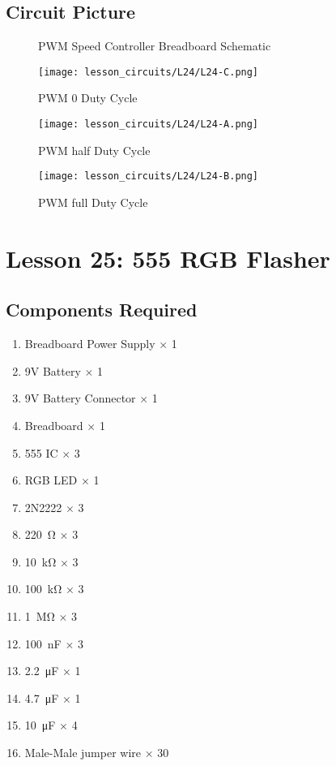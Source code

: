 \subsection{Circuit Picture}
\begin{figure}[!h]
    \centering
    \caption{PWM Speed Controller Breadboard Schematic}
    \label{fig:555_pwm_sch}
\end{figure}
\begin{figure}[!h]
    \centering
    \texttt{[image: lesson\_circuits/L24/L24-C.png]}
    \caption{PWM 0 Duty Cycle}
    \label{fig:555_pwm_obb}
\end{figure}
\begin{figure}[!h]
    \centering
    \texttt{[image: lesson\_circuits/L24/L24-A.png]}
    \caption{PWM half Duty Cycle}
    \label{fig:555_pwm_obb1}
\end{figure}
\begin{figure}[!h]
    \centering
    \texttt{[image: lesson\_circuits/L24/L24-B.png]}
    \caption{PWM full Duty Cycle}
    \label{fig:555_pwm_obb2}
\end{figure}
\section{Lesson 25: 555 RGB Flasher}
\subsection{Components Required}
\begin{enumerate}
    \item Breadboard Power Supply $\times$ 1
    \item 9V Battery $\times$ 1
    \item 9V Battery Connector $\times$ 1
    \item Breadboard $\times$ 1
    \item 555 IC $\times$ 3
    \item RGB LED $\times$ 1
    \item 2N2222 $\times$ 3
    \item \SI{220}{\ohm} $\times$ 3
    \item \SI{10}{\kilo\ohm} $\times$ 3
    \item \SI{100}{\kilo\ohm} $\times$ 3
    \item \SI{1}{\Mohm} $\times$ 3
    \item \SI{100}{\nano\farad} $\times$ 3
    \item \SI{2.2}{\micro\farad} $\times$ 1
    \item \SI{4.7}{\micro\farad} $\times$ 1
    \item \SI{10}{\micro\farad} $\times$ 4
    \item Male-Male jumper wire $\times$ 30
\end{enumerate}
